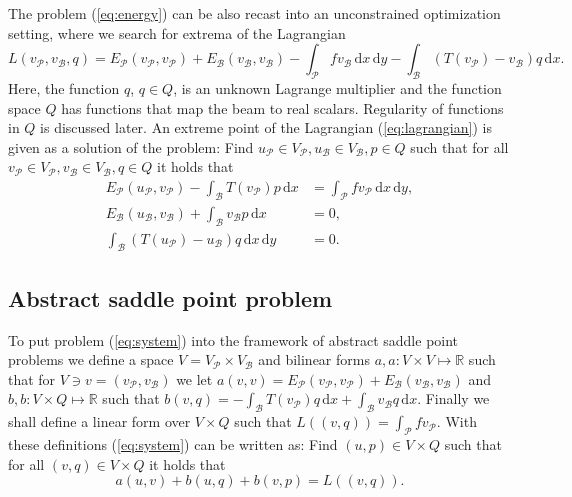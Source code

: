 \documentclass[a4paper,10pt]{article}
\newcommand{\R}{\ensuremath{\mathbb{R}}}
\newcommand{\meas}[1]{\ensuremath{\,\mathrm{d}#1}}
\newcommand{\Vp}{\ensuremath{V_{\mathcal{P}}}}
\newcommand{\Vb}{\ensuremath{V_{\mathcal{B}}}}
\newcommand{\Ep}{\ensuremath{E_{\mathcal{P}}}}
\newcommand{\Eb}{\ensuremath{E_{\mathcal{B}}}}
\newcommand{\up}{\ensuremath{u_{\mathcal{P}}}}
\newcommand{\ub}{\ensuremath{u_{\mathcal{B}}}}
\newcommand{\vp}{\ensuremath{v_{\mathcal{P}}}}
\newcommand{\vb}{\ensuremath{v_{\mathcal{B}}}}
\begin{document}
  The problem (\ref{eq:energy}) can be also recast into an unconstrained
  optimization setting, where we search for extrema of the Lagrangian
  \begin{equation}
    \label{eq:lagrangian}
    L(\vp, \vb, q) = \Ep(\vp, \vp) + \Eb(\vb, \vb) - \int_{\mathcal{P}}f \vb \meas{x}\meas{y} -
    \int_{\mathcal{B}}(T(\vp) - \vb)q \meas{x}.
  \end{equation}
  Here, the function $q$, $q\in Q$, is an unknown Lagrange multiplier
  and the function space $Q$ has functions that map the beam to real scalars.
  Regularity of functions in $Q$ is discussed later.
  An extreme point of the Lagrangian (\ref{eq:lagrangian}) is given as a
  solution of the problem: Find $\up\in\Vp, \ub\in\Vb, p\in Q$ such that
  for all $\vp\in\Vp, \vb\in\Vb, q\in Q$ it holds that
 \begin{equation}
    \label{eq:system}
    \begin{aligned}
      \Ep(\up, \vp) - \int_{\mathcal{B}}T(\vp)p\meas{x} &=
      \int_{\mathcal{P}}f\vp\meas{x}\meas{y}, \\
      \Eb(\ub, \vb) + \int_{\mathcal{B}}\vb p\meas{x} &= 0, \\
      \int_{\mathcal{B}}(T(\up)-\ub)q\meas{x}\meas{y} &= 0.
    \end{aligned}
  \end{equation}

  \subsection{Abstract saddle point problem}
  To put problem (\ref{eq:system}) into the framework of abstract saddle point
  problems we define a space $V=\Vp \times \Vb$ and bilinear forms
  $a, a:V\times V\mapsto\R$ such that for $V\ni v=(\vp, \vb)$ we let
  $a(v, v)=\Ep(\vp, \vp) + \Eb(\vb, \vb)$ and $b, b:V\times Q\mapsto\R$ such
  that $b(v, q)= - \int_{\mathcal{B}}T(\vp)q\meas{x} +
  \int_{\mathcal{B}}\vb q\meas{x}$. Finally we shall define a
  linear form over $V\times Q$ such that $L((v, q))=\int_\mathcal{P}f \vp$. With
  these definitions (\ref{eq:system}) can be written as: Find $(u, p)\in
  V\times Q$ such that for all $(v, q)\in V\times Q$ it holds that 
  \begin{equation}
    \label{eq:abstract_saddle}
    a(u, v) + b(u, q) + b(v, p) = L((v, q)). 
  \end{equation}
  
\end{document}
